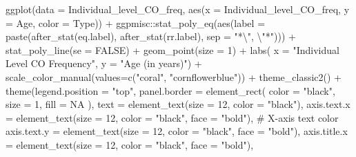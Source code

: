 \documentclass[
  letterpaper,
  DIV=11,
  numbers=noendperiod]{scrreprt}
\newenvironment{Shaded}{\begin{snugshade}}{\end{snugshade}}
\newcommand{\AttributeTok}[1]{\textcolor[rgb]{0.40,0.45,0.13}{#1}}
\newcommand{\CommentTok}[1]{\textcolor[rgb]{0.37,0.37,0.37}{#1}}
\newcommand{\ConstantTok}[1]{\textcolor[rgb]{0.56,0.35,0.01}{#1}}
\newcommand{\DecValTok}[1]{\textcolor[rgb]{0.68,0.00,0.00}{#1}}
\newcommand{\FunctionTok}[1]{\textcolor[rgb]{0.28,0.35,0.67}{#1}}
\newcommand{\NormalTok}[1]{\textcolor[rgb]{0.00,0.23,0.31}{#1}}
\newcommand{\SpecialCharTok}[1]{\textcolor[rgb]{0.37,0.37,0.37}{#1}}
\newcommand{\StringTok}[1]{\textcolor[rgb]{0.13,0.47,0.30}{#1}}
\begin{document}
\begin{codelisting}
\begin{Shaded}
\begin{Highlighting}[]
\FunctionTok{ggplot}\NormalTok{(}\AttributeTok{data =}\NormalTok{ Individual\_level\_CO\_freq, }\FunctionTok{aes}\NormalTok{(}\AttributeTok{x =}\NormalTok{ Individual\_level\_CO\_freq, }\AttributeTok{y =}\NormalTok{ Age, }\AttributeTok{color =}\NormalTok{ Type)) }\SpecialCharTok{+}
\NormalTok{  ggpmisc}\SpecialCharTok{::}\FunctionTok{stat\_poly\_eq}\NormalTok{(}\FunctionTok{aes}\NormalTok{(}\AttributeTok{label =} \FunctionTok{paste}\NormalTok{(}\FunctionTok{after\_stat}\NormalTok{(eq.label),}
                               \FunctionTok{after\_stat}\NormalTok{(rr.label), }\AttributeTok{sep =} \StringTok{"*}\SpecialCharTok{\textbackslash{}"}\StringTok{, }\SpecialCharTok{\textbackslash{}"}\StringTok{*"}\NormalTok{))) }\SpecialCharTok{+}
  \FunctionTok{stat\_poly\_line}\NormalTok{(}\AttributeTok{se =} \ConstantTok{FALSE}\NormalTok{) }\SpecialCharTok{+}
  \FunctionTok{geom\_point}\NormalTok{(}\AttributeTok{size =} \DecValTok{1}\NormalTok{) }\SpecialCharTok{+} 
  \FunctionTok{labs}\NormalTok{(}
       \AttributeTok{x =} \StringTok{"Individual Level CO Frequency"}\NormalTok{,}
       \AttributeTok{y =} \StringTok{"Age (in years)"}\NormalTok{) }\SpecialCharTok{+}
  \FunctionTok{scale\_color\_manual}\NormalTok{(}\AttributeTok{values=}\FunctionTok{c}\NormalTok{(}\StringTok{"coral"}\NormalTok{, }\StringTok{"cornflowerblue"}\NormalTok{)) }\SpecialCharTok{+} \FunctionTok{theme\_classic2}\NormalTok{() }\SpecialCharTok{+}
  \FunctionTok{theme}\NormalTok{(}\AttributeTok{legend.position =} \StringTok{"top"}\NormalTok{,}
        \AttributeTok{panel.border =} \FunctionTok{element\_rect}\NormalTok{(}
          \AttributeTok{color =} \StringTok{"black"}\NormalTok{,}
          \AttributeTok{size =} \DecValTok{1}\NormalTok{,}
          \AttributeTok{fill =} \ConstantTok{NA}
\NormalTok{          ),}
        \AttributeTok{text =} \FunctionTok{element\_text}\NormalTok{(}\AttributeTok{size =} \DecValTok{12}\NormalTok{, }\AttributeTok{color =} \StringTok{"black"}\NormalTok{),}
        \AttributeTok{axis.text.x =} \FunctionTok{element\_text}\NormalTok{(}\AttributeTok{size =} \DecValTok{12}\NormalTok{, }\AttributeTok{color =} \StringTok{"black"}\NormalTok{, }\AttributeTok{face =} \StringTok{"bold"}\NormalTok{),  }\CommentTok{\# X{-}axis text color}
        \AttributeTok{axis.text.y =} \FunctionTok{element\_text}\NormalTok{(}\AttributeTok{size =} \DecValTok{12}\NormalTok{, }\AttributeTok{color =} \StringTok{"black"}\NormalTok{, }\AttributeTok{face =} \StringTok{"bold"}\NormalTok{),}
        \AttributeTok{axis.title.x =} \FunctionTok{element\_text}\NormalTok{(}\AttributeTok{size =} \DecValTok{12}\NormalTok{, }\AttributeTok{color =} \StringTok{"black"}\NormalTok{, }\AttributeTok{face =} \StringTok{"bold"}\NormalTok{),}

\end{Highlighting}
\end{Shaded}
\end{codelisting}
\end{document}
